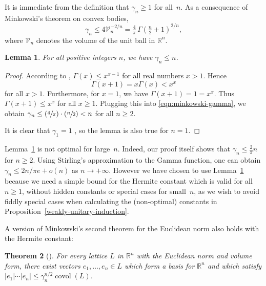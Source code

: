 \documentclass[11pt]{article}
\numberwithin{equation}{section}
\newcommand{\Psfrac}[2]{(\sfrac{#1}{#2})}
\newcommand{\bR}{\mathbb{R}}
\newcommand{\cV}{\mathcal{V}}
\DeclareMathOperator{\covol}{covol}
\newcommand{\abs}[1]{\lvert #1 \rvert}
\newtheorem{lemma}{Lemma}[section]
\newtheorem{theorem}[lemma]{Theorem}
\begin{document}
It is immediate from the definition that $\gamma_n \geq 1$ for all~$n$.
As a consequence of Minkowski's theorem on convex bodies,
\begin{equation} \label{eqn:minkowski-gamma}
\gamma_n \leq 4 \cV_n^{-2/n} = \tfrac{4}{\pi}\, \Gamma(\tfrac{n}{2} + 1)^{2/n},
\end{equation}
where $\cV_n$ denotes the volume of the unit ball in $\bR^n$.

\begin{lemma} \label{hermite-constant-bound}
For all positive integers $n$, we have $\gamma_n \leq n$.
\end{lemma}

\begin{proof}
According to \cite[Th.\,1.5]{AQ97}, $\Gamma(x) \!\leq\! x^{x-1}$ for all real numbers $x\!>\!1$.
Hence
\[
\Gamma(x+1) = x\Gamma(x) < x^x
\]
for all $x > 1$.
Furthermore, for $x=1$, we have $\Gamma(x+1) = 1 = x^x$.
Thus $\Gamma(x+1) \leq x^x$ for all $x \geq 1$.
Plugging this into \eqref{eqn:minkowski-gamma}, we obtain $\gamma_n \leq \Psfrac{4}{\pi} \cdot \Psfrac{n}{2} < n$ for all $n \geq 2$.

It is clear that $\gamma_1=1$ \cite[App.]{cassels:geom-of-numbers}, so the lemma is also true for $n=1$.
\end{proof}

Lemma~\ref{hermite-constant-bound} is not optimal for large~$n$.
Indeed, our proof itself shows that $\gamma_n \leq \frac{2}{\pi}n$ for $n \geq 2$.
Using Stirling's approximation to the Gamma function, one can obtain $\gamma_n \leq 2n/\pi e + o(n)$ as $n \to +\infty$.
However we have chosen to use Lemma~\ref{hermite-constant-bound} because we need a simple bound for the Hermite constant which is valid for all $n \geq 1$, without hidden constants or special cases for small~$n$, as we wish to avoid fiddly special cases when calculating the (non-optimal) constants in Proposition~\ref{weakly-unitary-induction}.

A version of Minkowski's second theorem for the Euclidean norm also holds with the Hermite constant:

\begin{theorem}[{\cite[Chap.\,VIII, Th.\,1]{cassels:geom-of-numbers}}] \label{minkowski-2nd}
For every lattice $L$ in $\bR^n$ with the Euclidean norm and volume form, there exist vectors $e_1, \dotsc, e_n \in L$ which form a basis for $\bR^n$ and which satisfy $\abs{e_1}\dotsm\abs{e_n} \leq \gamma_n^{n/2} \covol(L)$.
\end{theorem}
\end{document}
